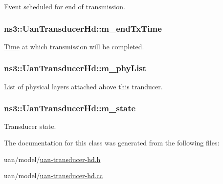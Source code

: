Event scheduled for end of transmission. 

\subsubsection[{\texorpdfstring{m\+\_\+end\+Tx\+Time}{m_endTxTime}}]{ ns3\+::\+Uan\+Transducer\+Hd\+::m\+\_\+end\+Tx\+Time\hspace{0.3cm}{\ttfamily [private]}}\hypertarget{classns3_1_1UanTransducerHd_adcf9f31a8fb4054fca32412a13179165}{}\label{classns3_1_1UanTransducerHd_adcf9f31a8fb4054fca32412a13179165}


\hyperlink{classns3_1_1Time}{Time} at which transmission will be completed. 

\subsubsection[{\texorpdfstring{m\+\_\+phy\+List}{m_phyList}}]{ ns3\+::\+Uan\+Transducer\+Hd\+::m\+\_\+phy\+List\hspace{0.3cm}{\ttfamily [private]}}\hypertarget{classns3_1_1UanTransducerHd_afb3b10ff175e4f315894b9ba13a8c490}{}\label{classns3_1_1UanTransducerHd_afb3b10ff175e4f315894b9ba13a8c490}


List of physical layers attached above this tranducer. 

\subsubsection[{\texorpdfstring{m\+\_\+state}{m_state}}]{ ns3\+::\+Uan\+Transducer\+Hd\+::m\+\_\+state\hspace{0.3cm}{\ttfamily [private]}}\hypertarget{classns3_1_1UanTransducerHd_a4f7b41e0c43685c3e6abebd1a543ab36}{}\label{classns3_1_1UanTransducerHd_a4f7b41e0c43685c3e6abebd1a543ab36}


Transducer state. 



The documentation for this class was generated from the following files\+:\begin{DoxyCompactItemize}
\item 
uan/model/\hyperlink{uan-transducer-hd_8h}{uan-\/transducer-\/hd.\+h}\item 
uan/model/\hyperlink{uan-transducer-hd_8cc}{uan-\/transducer-\/hd.\+cc}\end{DoxyCompactItemize}
